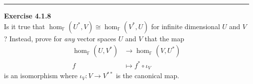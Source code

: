 \documentclass[a4paper, 12pt]{article}
\newenvironment{problem}[2][Exercise]
    { \begin{mdframed}[backgroundcolor=gray!20] \textbf{#1 #2} \\}
    {  \end{mdframed}}
\begin{document}
\noindent\rule{7in}{2.8pt}
\begin{problem}{4.1.8}
Is it true that \(\hom_{\mathbb{F}}(U^*,V)\cong \hom_{\mathbb{F}}(V^*,U)\) for infinite dimensional \(U\) and \(V\)? Instead, prove for \textit{any} vector spaces \(U\) and \(V\) that 
the map 
\begin{align*}
	\hom_{\mathbb{F}}(U,V^*) & \rightarrow \hom_{\mathbb{F}}(V,U^*)\\ 
	              	      f  & \mapsto f^*\circ \iota_V
\end{align*}
is an isomorphism where \(\iota_V:V\rightarrow V^{**}\) is the canonical map.
\end{problem}
\end{document}
